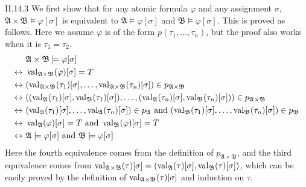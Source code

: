 \documentclass[12pt]{article}
\begin{document}
\begin{customthm}{II.14.3}
  We first show that for any atomic formula $\varphi$ and any assignment $\sigma$, $\mathfrak{A}\times\mathfrak{B}\models\varphi[\sigma]$ is equivalent to $\mathfrak{A}\models\varphi[\sigma]$ and $\mathfrak{B}\models\varphi[\sigma]$. This is proved as follows. Here we assume $\varphi$ is of the form $p(\tau_1,\ldots,\tau_n)$, but the proof also works when it is $\tau_1=\tau_2$.
  \begin{align*}
    &\mathfrak{A}\times\mathfrak{B}\models\varphi[\sigma] \\
    \leftrightarrow~&\textstyle\mathop{\mathrm{val}}_{\mathfrak{A}\times\mathfrak{B}}(\varphi)[\sigma]=T \\
    \leftrightarrow~&\textstyle(\mathop{\mathrm{val}}_{\mathfrak{A}\times\mathfrak{B}}(\tau_1)[\sigma],\ldots,\mathop{\mathrm{val}}_{\mathfrak{A}\times\mathfrak{B}}(\tau_n)[\sigma])\in p_{\mathfrak{A}\times\mathfrak{B}} \\
    \leftrightarrow~&\textstyle((\mathop{\mathrm{val}}_\mathfrak{A}(\tau_1)[\sigma],\mathop{\mathrm{val}}_\mathfrak{B}(\tau_1)[\sigma]),\ldots,(\mathop{\mathrm{val}}_\mathfrak{A}(\tau_n)[\sigma],\mathop{\mathrm{val}}_\mathfrak{B}(\tau_n)[\sigma]))\in p_{\mathfrak{A}\times\mathfrak{B}} \\
    \leftrightarrow~&\textstyle(\mathop{\mathrm{val}}_\mathfrak{A}(\tau_1)[\sigma],\ldots,\mathop{\mathrm{val}}_\mathfrak{A}(\tau_n)[\sigma])\in p_\mathfrak{A}\mbox{ and }(\mathop{\mathrm{val}}_\mathfrak{B}(\tau_1)[\sigma],\ldots,\mathop{\mathrm{val}}_\mathfrak{B}(\tau_n)[\sigma])\in p_\mathfrak{B} \\
    \leftrightarrow~&\textstyle\mathop{\mathrm{val}}_\mathfrak{A}(\varphi)[\sigma]=T\mbox{ and }\mathop{\mathrm{val}}_\mathfrak{B}(\varphi)[\sigma]=T \\
    \leftrightarrow~&\mathfrak{A}\models\varphi[\sigma]\mbox{ and }\mathfrak{B}\models\varphi[\sigma] \\
  \end{align*}
  Here the fourth equivalence comes from the definition of $p_{\mathfrak{A}\times\mathfrak{B}}$, and the third equivalence comes from $\mathop{\mathrm{val}}_{\mathfrak{A}\times\mathfrak{B}}(\tau)[\sigma]=(\mathop{\mathrm{val}}_\mathfrak{A}(\tau)[\sigma],\mathop{\mathrm{val}}_\mathfrak{B}(\tau)[\sigma])$, which can be easily proved by the definition of $\mathop{\mathrm{val}}_{\mathfrak{A}\times\mathfrak{B}}(\tau)[\sigma]$ and induction on $\tau$.


\end{customthm}
\end{document}
